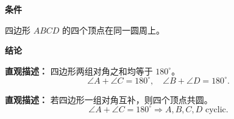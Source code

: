 \begin{statementbox}
	\textbf{\textcolor{CStatement}{条件}}
	\begin{description}[style=nextline, leftmargin=2.8em, labelsep=0.5em, itemsep=0.35em]
		\item[\textbf{\textcolor{CStatement}{条件 1（内接四边形）：}}] 四边形 $ABCD$ 的四个顶点在同一圆周上。
	\end{description}

	\textbf{\textcolor{CStatement}{结论}}
	\begin{description}[style=nextline, leftmargin=2.8em, labelsep=0.5em, itemsep=0.45em]
		\item[\textbf{\textcolor{CStatement}{结论一（对角互补）：}}]
			\textbf{\textcolor{CStatement}{直观描述：}}
			四边形两组对角之和均等于 $180^\circ$。
			\[
				\angle A+\angle C=180^\circ,\quad \angle B+\angle D=180^\circ.
			\]

		\item[\textbf{\textcolor{CStatement}{常见变形（四点共圆判定）：}}]
			\textbf{\textcolor{CStatement}{直观描述：}}
			若四边形一组对角互补，则四个顶点共圆。
			\[
				\angle A+\angle C=180^\circ \Rightarrow A,B,C,D \text{ cyclic}.
			\]

	\end{description}

\end{statementbox}
